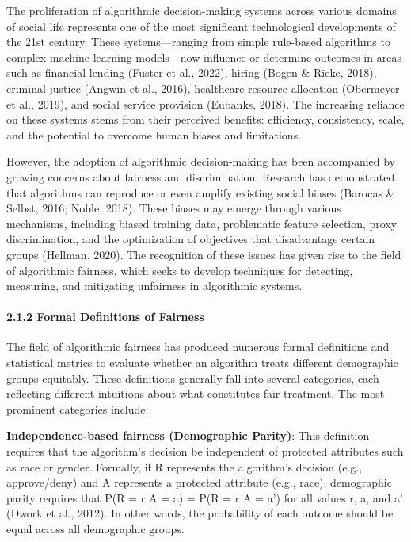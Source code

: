 The proliferation of algorithmic decision-making systems across various
domains of social life represents one of the most significant
technological developments of the 21st century. These systems---ranging
from simple rule-based algorithms to complex machine learning
models---now influence or determine outcomes in areas such as financial
lending (Fuster et al., 2022), hiring (Bogen \& Rieke, 2018), criminal
justice (Angwin et al., 2016), healthcare resource allocation (Obermeyer
et al., 2019), and social service provision (Eubanks, 2018). The
increasing reliance on these systems stems from their perceived
benefits: efficiency, consistency, scale, and the potential to overcome
human biases and limitations.

However, the adoption of algorithmic decision-making has been
accompanied by growing concerns about fairness and discrimination.
Research has demonstrated that algorithms can reproduce or even amplify
existing social biases (Barocas \& Selbst, 2016; Noble, 2018). These
biases may emerge through various mechanisms, including biased training
data, problematic feature selection, proxy discrimination, and the
optimization of objectives that disadvantage certain groups (Hellman,
2020). The recognition of these issues has given rise to the field of
algorithmic fairness, which seeks to develop techniques for detecting,
measuring, and mitigating unfairness in algorithmic systems.

\paragraph{2.1.2 Formal Definitions of
Fairness}\label{formal-definitions-of-fairness}

The field of algorithmic fairness has produced numerous formal
definitions and statistical metrics to evaluate whether an algorithm
treats different demographic groups equitably. These definitions
generally fall into several categories, each reflecting different
intuitions about what constitutes fair treatment. The most prominent
categories include:

\textbf{Independence-based fairness (Demographic Parity)}: This
definition requires that the algorithm's decision be independent of
protected attributes such as race or gender. Formally, if R represents
the algorithm's decision (e.g., approve/deny) and A represents a
protected attribute (e.g., race), demographic parity requires that P(R =
r \textbar{} A = a) = P(R = r \textbar{} A = a') for all values r, a,
and a' (Dwork et al., 2012). In other words, the probability of each
outcome should be equal across all demographic groups.

